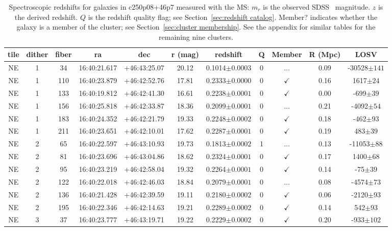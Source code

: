 \begin{table*}
	\centering \caption{Spectroscopic redshifts for galaxies in c250p08+46p7 measured with the MS: $m_r$ is the observed SDSS \sdssr\ magnitude. $z$ is the derived redshift. $Q$ is the redshift quality flag; see Section~\ref{sec:redshift catalog}. Member? indicates whether the galaxy is a member of the cluster; see Section~\ref{sec:cluster membership}. See the appendix for similar tables for the remaining nine clusters.}
	\begin{tabular}{ccccccccccc}
		\hline
		tile & dither & fiber & ra & dec & r (mag) & redshift & Q & Member & R (Mpc) & LOSV \\
		\hline \hline
NE & 1 & 34 & 16:40:21.617 & +46:43:25.07 & 20.12 & 0.1014$\pm{0.0003}$ & 0 & ... & 0.09 & -30528$\pm{141}$ \\
NE & 1 & 110 & 16:40:23.879 & +46:42:52.76 & 17.81 & 0.2333$\pm{0.0000}$ & 0 & $\checkmark$ & 0.16 & 1617$\pm{24}$ \\
NE & 1 & 133 & 16:40:19.812 & +46:42:41.30 & 16.61 & 0.2238$\pm{0.0001}$ & 0 & $\checkmark$ & 0.00 & -699$\pm{39}$ \\
NE & 1 & 156 & 16:40:25.818 & +46:42:33.87 & 18.36 & 0.2099$\pm{0.0001}$ & 0 & ... & 0.21 & -4092$\pm{54}$ \\
NE & 1 & 183 & 16:40:24.352 & +46:42:21.79 & 19.33 & 0.2248$\pm{0.0002}$ & 0 & $\checkmark$ & 0.18 & -462$\pm{93}$ \\
NE & 1 & 211 & 16:40:23.651 & +46:42:10.01 & 17.62 & 0.2287$\pm{0.0001}$ & 0 & $\checkmark$ & 0.19 & 483$\pm{39}$ \\
NE & 2 & 65 & 16:40:22.597 & +46:43:10.93 & 19.73 & 0.1813$\pm{0.0002}$ & 1 & ... & 0.13 & -11053$\pm{88}$ \\
NE & 2 & 81 & 16:40:23.696 & +46:43:04.86 & 18.62 & 0.2324$\pm{0.0001}$ & 0 & $\checkmark$ & 0.17 & 1400$\pm{68}$ \\
NE & 2 & 95 & 16:40:23.219 & +46:42:58.04 & 19.32 & 0.2264$\pm{0.0001}$ & 0 & $\checkmark$ & 0.14 & -75$\pm{39}$ \\
NE & 2 & 122 & 16:40:22.018 & +46:42:46.03 & 18.84 & 0.2079$\pm{0.0001}$ & 0 & ... & 0.08 & -4574$\pm{73}$ \\
NE & 2 & 136 & 16:40:21.428 & +46:42:39.59 & 19.11 & 0.2180$\pm{0.0002}$ & 0 & $\checkmark$ & 0.06 & -2120$\pm{93}$ \\
NE & 2 & 195 & 16:40:22.346 & +46:42:14.63 & 19.21 & 0.2289$\pm{0.0002}$ & 0 & $\checkmark$ & 0.14 & 542$\pm{93}$ \\
NE & 3 & 37 & 16:40:23.777 & +46:43:19.71 & 19.22 & 0.2229$\pm{0.0002}$ & 0 & $\checkmark$ & 0.20 & -933$\pm{102}$ \\

\end{tabular}
\end{table*}
